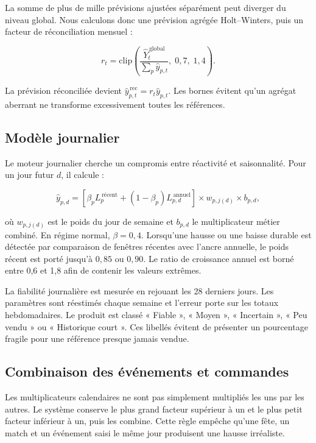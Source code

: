 La somme de plus de mille prévisions ajustées séparément peut diverger du niveau
global. Nous calculons donc une prévision agrégée Holt--Winters, puis un facteur de
réconciliation mensuel :

\begin{equation}
r_t = \mathrm{clip}\left(
\frac{\widehat{Y}^{\,\mathrm{global}}_t}
{\sum_p \widehat{y}_{p,t}},\;0{,}7,\;1{,}4\right).
\end{equation}

La prévision réconciliée devient
$\widehat{y}^{\,\mathrm{rec}}_{p,t}=r_t\widehat{y}_{p,t}$. Les bornes évitent qu'un
agrégat aberrant ne transforme excessivement toutes les références.

\subsection{Modèle journalier}

Le moteur journalier cherche un compromis entre réactivité et saisonnalité. Pour
un jour futur $d$, il calcule :

\begin{equation}
\widehat{y}_{p,d}=\left[\beta_p L^{\,\text{récent}}_p+
(1-\beta_p)L^{\,\text{annuel}}_{p,d}\right]
\times w_{p,j(d)} \times b_{p,d},
\end{equation}

où $w_{p,j(d)}$ est le poids du jour de semaine et $b_{p,d}$ le multiplicateur
métier combiné. En régime normal, $\beta=0{,}4$. Lorsqu'une hausse ou une baisse
durable est détectée par comparaison de fenêtres récentes avec l'ancre annuelle,
le poids récent est porté jusqu'à $0{,}85$ ou $0{,}90$. Le ratio de croissance
annuel est borné entre 0,6 et 1,8 afin de contenir les valeurs extrêmes.

La fiabilité journalière est mesurée en rejouant les 28 derniers jours. Les
paramètres sont réestimés chaque semaine et l'erreur porte sur les totaux
hebdomadaires. Le produit est classé « Fiable », « Moyen », « Incertain », « Peu
vendu » ou « Historique court ». Ces libellés évitent de présenter un pourcentage
fragile pour une référence presque jamais vendue.

\subsection{Combinaison des événements et commandes}

Les multiplicateurs calendaires ne sont pas simplement multipliés les uns par les
autres. Le système conserve le plus grand facteur supérieur à un et le plus petit
facteur inférieur à un, puis les combine. Cette règle empêche qu'une fête, un
match et un événement saisi le même jour produisent une hausse irréaliste.

